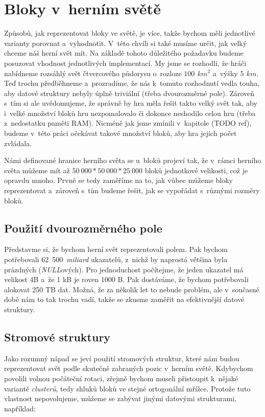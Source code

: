 
\section{Bloky v~herním světě}
\label{sec:blocksWorld}

Způsobů, jak reprezentovat bloky ve světě, je více, takže bychom měli jednotlivé varianty porovnat a~vyhodnotit. V~této chvíli si také musíme určit, jak velký chceme náš herní svět mít. Na základě tohoto důležitého požadavku budeme posuzovat vhodnost jednotlivých implementací. My jsme se rozhodli, že hráči nabídneme rozsáhlý svět čtvercového půdorysu o~rozloze $100\,\ km^2$ a~výšky $5\,\ km$. Teď trochu předběhneme a~prozradíme, že nás k~tomuto rozhodnutí vedla touha, aby datové struktury nebyly úplně triviální (třeba dvourozměrné pole). Zároveň s~tím si ale uvědomujeme, že správně by hra měla řešit takto velký svět tak, aby i~velké množství bloků hru nezpomalovalo či dokonce neshodilo celou hru (třeba z~nedostatku paměti RAM). Nicméně jak jsme zmínili v~kapitole (TODO ref), budeme v~této práci očekávat takové množství bloků, aby hra jejich počet zvládala.

Námi definované hranice herního světa se u~bloků projeví tak, že v~rámci herního světa můžeme mít až  $50~000 * 50~000 * 25~000$ bloků jednotkové velikosti, což je opravdu mnoho. Prvně se tedy zaměříme na to, jak vůbec můžeme bloky reprezentovat a~zároveň s~tím budeme řešit, jak se vypořádat s~různými rozměry bloků.

\subsection{Použití dvourozměrného pole}

Představme si, že bychom herní svět reprezentovali polem. Pak bychom potřebovali 62~500~\textit{miliard} ukazatelů, z~nichž by naprostá většina byla prázdných (\textit{NULL}ových). Pro jednoduchost počítejme, že jeden ukazatel má velikost 4B a~že 1 kB je roven 1000 B. Pak dostáváme, že bychom potřebovali alokovat 250 TB dat. Možná, že za několik let to nebude problém, ale v~současné době nám to tak trochu vadí, takže se zkusme zaměřit na efektivnější datové struktury.

\subsection{Stromové struktury}

Jako rozumný nápad se jeví použití stromových struktur, které nám budou reprezentovat svět podle skutečně zabraných pozic v~herním světě. Kdybychom povolili volnou počáteční rotaci, zřejmě bychom museli přistoupit k~nějaké variantě \textit{clusterů}, tedy shluků bloků ve stejné ortogonální mřížce. Protože tuto vlastnost nepovolujeme, můžeme se zabývat jinými datovými strukturami, například:

